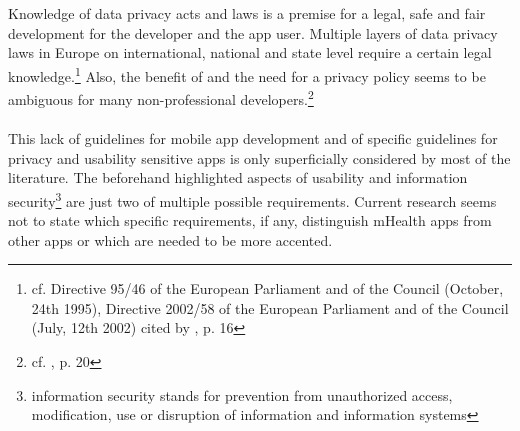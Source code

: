 \\
\\
Knowledge of data privacy acts and laws is a premise for a legal, safe and fair development for the developer and the app user. Multiple layers of data privacy laws in Europe on international, national and state level require a certain legal knowledge.\footnote{cf. Directive 95/46 of the European Parliament and of the Council (October, 24th 1995), Directive 2002/58 of the European Parliament and of the Council (July, 12th 2002) cited by \cite{FutureofPrivacyForumCenterforDemocracy&Technology.2011}, p. 16} Also, the benefit of and the need for a privacy policy seems to be ambiguous for many non-professional developers.\footnote{cf. \cite{Njie.2013}, p. 20}
\\
\\
This lack of guidelines for mobile app development and of specific guidelines for privacy and usability sensitive apps is only superficially considered by most of the literature. The beforehand highlighted aspects of usability and information security\footnote{information security stands for prevention from unauthorized access, modification, use or disruption of information and information systems} are just two of multiple possible requirements. Current research seems not to state which specific requirements, if any, distinguish mHealth apps from other apps or which are needed to be more accented.

